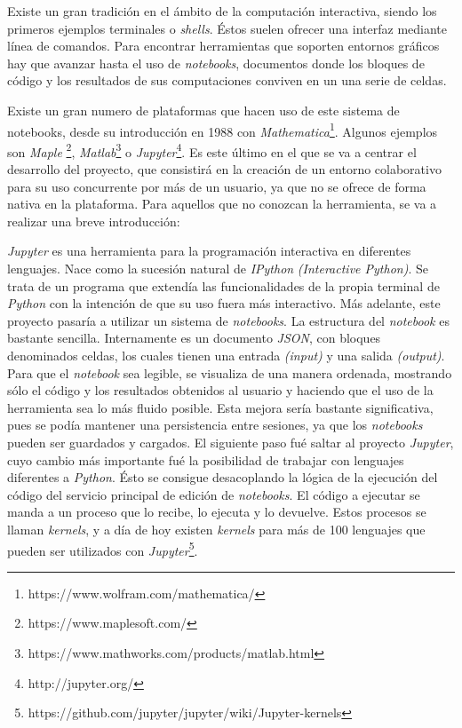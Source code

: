 \documentclass[11pt,spanish,listoffigures]{tfgetsinf}
\begin{document}
Existe un gran tradición en el ámbito de la computación interactiva, siendo los primeros ejemplos terminales o \textit{shells}. Éstos suelen ofrecer una interfaz mediante línea de comandos. Para encontrar herramientas que soporten entornos gráficos hay que avanzar hasta el uso de \textit{\gls{notebook}s}, documentos donde los bloques de código y los resultados de sus computaciones conviven en un una serie de celdas.

Existe un gran numero de plataformas que hacen uso de este sistema de notebooks, desde su introducción en 1988 con \textit{Mathematica}\footnote{https://www.wolfram.com/mathematica/}. Algunos ejemplos son \textit{Maple} \footnote{https://www.maplesoft.com/}, \textit{Matlab}\footnote{https://www.mathworks.com/products/matlab.html} o \textit{Jupyter}\footnote{http://jupyter.org/}. Es este último en el que se va a centrar el desarrollo del proyecto, que consistirá en la creación de un entorno colaborativo para su uso concurrente por más de un usuario, ya que no se ofrece de forma nativa en la plataforma. Para aquellos que no conozcan la herramienta, se va a realizar una breve introducción:

\textit{Jupyter } es una herramienta para la programación interactiva en diferentes lenguajes. Nace como la sucesión natural de \textit{IPython} \textit{(Interactive Python)}. Se trata de un programa que extendía las funcionalidades de la propia terminal de \textit{Python} con la intención de que su uso fuera más interactivo. Más adelante, este proyecto pasaría a utilizar un sistema de \textit{notebooks}. La estructura del \textit{notebook} es bastante sencilla. Internamente es un documento \textit{\gls{JSON}}, con bloques denominados celdas, los cuales tienen una entrada \textit{(input)} y una salida \textit{(output)}. Para que el \textit{notebook} sea legible, se visualiza de una manera ordenada, mostrando sólo el código y los resultados obtenidos al usuario y haciendo que el uso de la herramienta sea lo más fluido posible.   
Esta mejora sería bastante significativa, pues se podía mantener una persistencia entre sesiones, ya que los \textit{notebooks} pueden ser guardados y cargados. El siguiente paso fué saltar al proyecto \textit{Jupyter}, cuyo cambio más importante fué la posibilidad de trabajar con lenguajes diferentes a \textit{Python}. Ésto se consigue desacoplando la lógica de la ejecución del código del servicio principal de edición de \textit{notebooks}. El código a ejecutar se manda a un proceso que lo recibe, lo ejecuta y lo devuelve. Estos procesos se llaman \textit{kernels}, y a día de hoy existen \textit{kernels} para más de 100 lenguajes que pueden ser utilizados con \textit{Jupyter}\footnote{https://github.com/jupyter/jupyter/wiki/Jupyter-kernels}.
\end{document}
